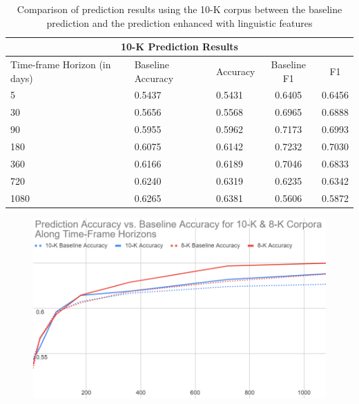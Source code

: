 \documentclass[11pt,a4paper]{article}
\begin{document}
\begin{table}[h!]
\begin{adjustwidth}{0in}{0in}
\begin{tabular}{ |p{1.4cm}| p{1.5cm} p{1.2cm} c c|  }
 \hline
 \multicolumn{5}{|c|}{10-K Prediction Results} \\
 \hline
 Time-frame Horizon (in days)& Baseline Accuracy & Accuracy & Baseline F1 & F1\\
 \hline
5    & 0.5437 & 0.5431 & 0.6405 & 0.6456\\
30   & 0.5656 & 0.5568 & 0.6965 & 0.6888\\
90   & 0.5955 & 0.5962 & 0.7173 & 0.6993\\
180  & 0.6075 & 0.6142 & 0.7232 & 0.7030\\
360  & 0.6166 & 0.6189 & 0.7046 & 0.6833\\
720  & 0.6240 & 0.6319 & 0.6235 & 0.6342\\
1080 & 0.6265 & 0.6381 & 0.5606 & 0.5872\\
 \hline
\end{tabular}

\caption{Comparison of prediction results using the 10-K corpus between the baseline prediction and the prediction enhanced with linguistic features}
\end{adjustwidth}
\label{table:2}
\end{table}

\begin{figure}[t]
\begin{adjustwidth}{-0.5in}{0in}
\caption{}
\includegraphics[scale=0.285]{accuracy_figure}
\end{adjustwidth}
\end{figure}
\end{document}

